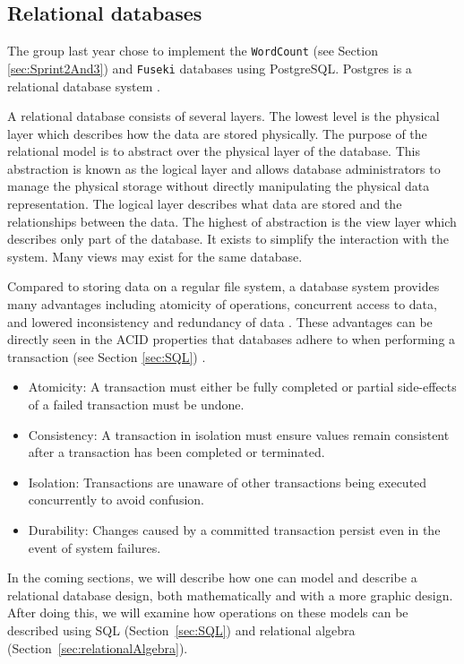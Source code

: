 \subsection{Relational databases}
The group last year chose to implement the \texttt{WordCount} (see Section \ref{sec:Sprint2And3}) and \texttt{Fuseki} databases using PostgreSQL.
Postgres is a relational database system \cite{knox2020}.


A relational database consists of several layers.
The lowest level is the physical layer which describes how the data are stored physically.
The purpose of the relational model is to abstract over the physical layer of the database.
This abstraction is known as the logical layer and allows database administrators to manage the physical storage without directly manipulating the physical data representation.
The logical layer describes what data are stored and the relationships between the data.
The highest of abstraction is the view layer which describes only part of the database. It exists to simplify the interaction with the system. Many views may exist for the same database.
\cite[Chapter 1.3]{DBSBook}

Compared to storing data on a regular file system, a database system provides many advantages including atomicity of operations, concurrent access to data, and lowered inconsistency and redundancy of data \cite[Chapter 1.2]{DBSBook}.
These advantages can be directly seen in the ACID properties that databases adhere to when performing a transaction (see Section \ref{sec:SQL}) \cite[Chapter~17]{DBSBook}.
\begin{itemize} \label{ACID}
    \item Atomicity: A transaction must either be fully completed or partial side-effects of a failed transaction must be undone.
    \item Consistency: A transaction in isolation must ensure values remain consistent after a transaction has been completed or terminated.
    \item Isolation: Transactions are unaware of other transactions being executed concurrently to avoid confusion.
    \item Durability: Changes caused by a committed transaction persist even in the event of system failures.
\end{itemize}

In the coming sections, we will describe how one can model and describe a relational database design, both mathematically and with a more graphic design.
After doing this, we will examine how operations on these models can be described using SQL (Section~\ref{sec:SQL}) and relational algebra (Section~\ref{sec:relationalAlgebra}).

